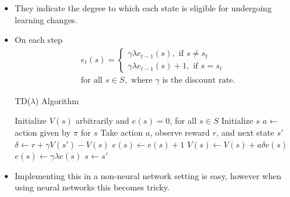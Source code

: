 \documentclass[a4paper]{article}
\begin{document}
\begin{itemize}
    \item They indicate the degree to which each state is eligible for undergoing learning changes.
    \item On each step
    \begin{equation*}
        \begin{split}
            e_t(s)=\begin{cases}
                \gamma \lambda e_{t-1}(s),\text{ if }s\neq s_t\\
                \gamma \lambda e_{t-1}(s)+1,\text{ if }s=s_t
            \end{cases}\\
            \text{for all }s\in S,\text{ where }\gamma \text{ is the discount rate.}
        \end{split}
    \end{equation*}
    \begin{algorithm}[H]
        \caption{TD($\lambda$) Algorithm}
        \begin{algorithmic}[1]
            \State Initialize $V(s)$ arbitrarily and $e(s)=0$, for all $s\in S$
                \State Initialize $s$
                \Repeat
                    \State $a\gets$ action given by $\pi$ for $s$
                    \State Take action $a$, observe reward $r$, and next state $s'$
                    \State $\delta \gets r+\gamma V(s')-V(s)$
                    \State $e(s)\gets e(s)+1$
                        \State $V(s)\gets V(s)+a\delta e(s)$
                        \State $e(s)\gets \gamma \lambda e(s)$
                    \EndFor
                    \State $s\gets s'$
            \EndFor
        \end{algorithmic}
    \end{algorithm}
    \item Implementing this in a non-neural network setting is easy, however when using neural networks this becomes tricky.
\end{itemize}
\end{document}
